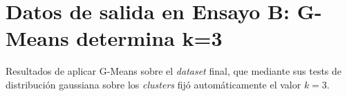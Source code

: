 \chapter{Datos de salida en Ensayo B: G-Means determina k=3}\label{app:ensayoB}

Resultados de aplicar G-Means sobre el \emph{dataset} final, que mediante sus tests de distribución gaussiana sobre los \emph{clusters} fijó automáticamente el valor $k=3$.


